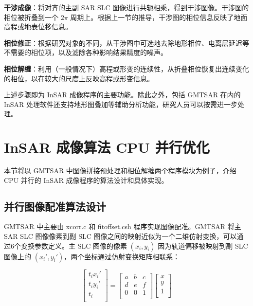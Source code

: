 \textbf{干涉成像}：将对齐的主副 SAR SLC 图像进行共轭相乘，得到干涉图像。干涉图的相位被折叠到一个 $2\pi$ 周期上。根据上一节的推导，干涉图的相位信息反映了地面高程或地表位移信息。

\textbf{相位修正}：根据研究对象的不同，从干涉图中可选地去除地形相位、电离层延迟等不需要的相位项，以及滤除各种影响结果精度的噪声。

\textbf{相位解缠}：利用（一般情况下）高程或形变的连续性，从折叠相位恢复出连续变化的相位，以在较大的尺度上反映高程或形变信息。

上述步骤即为 InSAR 成像程序的主要功能。除此之外，包括 GMTSAR 在内的 InSAR 处理软件还支持地形图叠加等辅助分析功能，研究人员可以按需进一步处理。

\section{InSAR 成像算法 CPU 并行优化}

本节将以 GMTSAR 中图像拼接预处理和相位解缠两个程序模块为例子，介绍 CPU 并行的 InSAR 成像程序的算法设计和具体实现。

\subsection{并行图像配准算法设计}

GMTSAR 中主要由 xcorr.c 和 fitoffset.csh 程序实现图像配准。GMTSAR 将主 SAR SLC 图像像素到副 SLC 图像之间的映射近似为一个二维仿射变换，可以通过6个变换参数定义。主 SLC 图像的像素 $(x_i, y_i)$ 因为轨道偏移被映射到副 SLC 图像上的 $(x_i', y_i')$，两个坐标通过仿射变换矩阵相联系：

\begin{equation}
\begin{bmatrix}
  t_i x_i' \\
  t_i y_i' \\
  t_i \\
\end{bmatrix}
= \begin{bmatrix}
       a & b & c \\
       d & e & f \\
       0 & 0 & 1 \\
\end{bmatrix}
\begin{bmatrix}
  x \\
  y \\
  1 \\
\end{bmatrix}
\end{equation}

